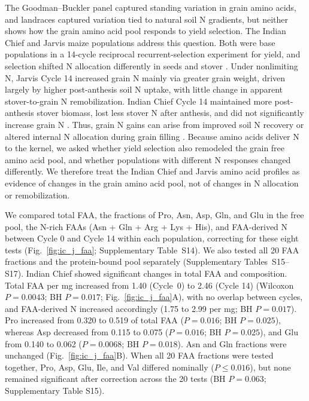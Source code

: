 The Goodman--Buckler panel captured standing variation in grain amino acids, and landraces captured variation tied to natural soil N gradients, but neither shows how the grain amino acid pool responds to yield selection. The Indian Chief and Jarvis maize populations address this question. Both were base populations in a 14-cycle reciprocal recurrent-selection experiment for yield, and selection shifted N allocation differently in seeds and stover \citep{Moll1994}. Under nonlimiting N, Jarvis Cycle 14 increased grain N mainly via greater grain weight, driven largely by higher post-anthesis soil N uptake, with little change in apparent stover-to-grain N remobilization. Indian Chief Cycle 14 maintained more post-anthesis stover biomass, lost less stover N after anthesis, and did not significantly increase grain N \citep{Moll1994}. Thus, grain N gains can arise from improved soil N recovery or altered internal N allocation during grain filling \citep{Mueller2019NUE}. Because amino acids deliver N to the kernel, we asked whether yield selection also remodeled the grain free amino acid pool, and whether populations with different N responses changed differently. We therefore treat the Indian Chief and Jarvis amino acid profiles as evidence of changes in the grain amino acid pool, not of changes in N allocation or remobilization.

We compared total FAA, the fractions of Pro, Asn, Asp, Gln, and Glu in the free pool, the N-rich FAAs (Asn + Gln + Arg + Lys + His), and FAA-derived N between Cycle 0 and Cycle 14 within each population, correcting for these eight tests (Fig.~\ref{fig:ic_j_faa}; Supplementary Table~S14). We also tested all 20 FAA fractions and the protein-bound pool separately (Supplementary Tables~S15--S17). Indian Chief showed significant changes in total FAA and composition. Total FAA per mg increased from 1.40 (Cycle~0) to 2.46 (Cycle 14) (Wilcoxon $P = 0.0043$; BH $P = 0.017$; Fig.~\ref{fig:ic_j_faa}A), with no overlap between cycles, and FAA-derived N increased accordingly (1.75 to 2.99 per mg; BH $P = 0.017$). Pro increased from 0.320 to 0.519 of total FAA ($P = 0.016$; BH $P = 0.025$), whereas Asp decreased from 0.115 to 0.075 ($P = 0.016$; BH $P = 0.025$), and Glu from 0.140 to 0.062 ($P = 0.0068$; BH $P = 0.018$). Asn and Gln fractions were unchanged (Fig.~\ref{fig:ic_j_faa}B). When all 20 FAA fractions were tested together, Pro, Asp, Glu, Ile, and Val differed nominally ($P \le 0.016$), but none remained significant after correction across the 20 tests (BH $P = 0.063$; Supplementary Table S15).

